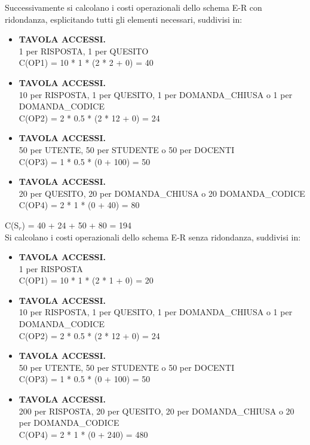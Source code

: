 \documentclass{article}
\begin{document}
Successivamente si calcolano i costi operazionali dello schema E-R con ridondanza, esplicitando tutti gli elementi necessari, suddivisi in:
\begin{itemize}[label={ }]
    \itemsep0em 
    \item {\small\textbf{TAVOLA ACCESSI.} \\ 1 per RISPOSTA, 1 per QUESITO} \vspace*{2pt}\\ C(OP1) = 10 * 1 * (2 * 2 + 0) = 40 \vspace*{2pt} 
    \item {\small\textbf{TAVOLA ACCESSI.} \\ 10 per RISPOSTA, 1 per QUESITO, 1 per DOMANDA\_CHIUSA o 1 per DOMANDA\_CODICE} \vspace*{2pt}\\ C(OP2) = 2 * 0.5 * (2 * 12 + 0) = 24 \vspace*{2pt}
    \item {\small\textbf{TAVOLA ACCESSI.} \\ 50 per UTENTE, 50 per STUDENTE o 50 per DOCENTI} \vspace*{2pt}\\ C(OP3) = 1 * 0.5 * (0 + 100) = 50
    \item {\small\textbf{TAVOLA ACCESSI.} \\ 20 per QUESITO, 20 per DOMANDA\_CHIUSA o 20 DOMANDA\_CODICE } \vspace*{1pt}\\ C(OP4) = 2 * 1 * (0 + 40) = 80
\end{itemize}
\hspace*{15pt}C(S$_r$) = 40 + 24 + 50 + 80 = 194 \vspace*{7pt}\\
Si calcolano i costi operazionali dello schema E-R senza ridondanza, suddivisi in:
\begin{itemize}[label={ }]
    \itemsep0em 
    \item {\small\textbf{TAVOLA ACCESSI.} \\ 1 per RISPOSTA} \vspace*{2pt}\\ C(OP1) = 10 * 1 * (2 * 1 + 0) = 20 \vspace*{2pt} 
    \item {\small\textbf{TAVOLA ACCESSI.} \\ 10 per RISPOSTA, 1 per QUESITO, 1 per DOMANDA\_CHIUSA o 1 per DOMANDA\_CODICE} \vspace*{2pt}\\ C(OP2) = 2 * 0.5 * (2 * 12 + 0) = 24 \vspace*{2pt}
    \item {\small\textbf{TAVOLA ACCESSI.} \\ 50 per UTENTE, 50 per STUDENTE o 50 per DOCENTI} \vspace*{2pt}\\ C(OP3) = 1 * 0.5 * (0 + 100) = 50
    \item {\small\textbf{TAVOLA ACCESSI.} \\ 200 per RISPOSTA, 20 per QUESITO, 20 per DOMANDA\_CHIUSA o 20 per DOMANDA\_CODICE} \vspace*{2pt}\\ C(OP4) = 2 * 1 * (0 + 240) = 480
\end{itemize}
\end{document}
